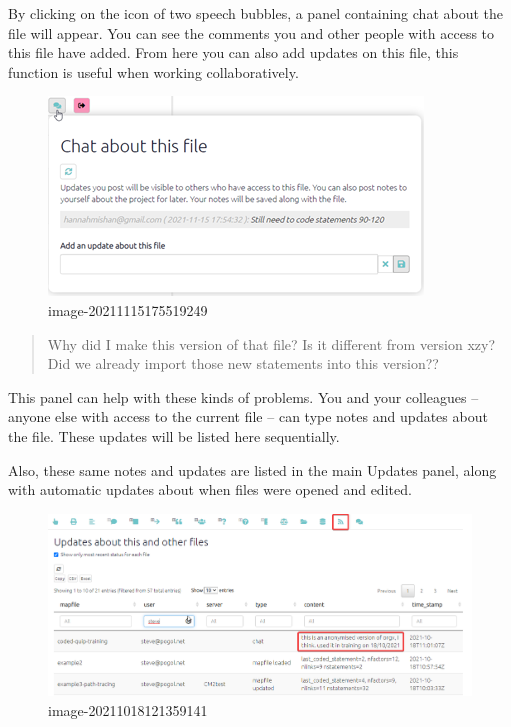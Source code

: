 \documentclass[
]{book}
\begin{document}
By clicking on the icon of two speech bubbles, a panel containing chat about the file will appear. You can see the comments you and other people with access to this file have added. From here you can also add updates on this file, this function is useful when working collaboratively.

\begin{figure}
\centering
\includegraphics{_assets/image-20211115175519249.png}
\caption{image-20211115175519249}
\end{figure}

\begin{quote}
Why did I make this version of that file? Is it different from version xzy? Did we already import those new statements into this version??
\end{quote}

This panel can help with these kinds of problems. You and your colleagues -- anyone else with access to the current file -- can type notes and updates about the file. These updates will be listed here sequentially.

Also, these same notes and updates are listed in the main Updates panel, along with automatic updates about when files were opened and edited.

\begin{figure}
\centering
\includegraphics{_assets/image-20211018121359141.png}
\caption{image-20211018121359141}
\end{figure}
\end{document}
